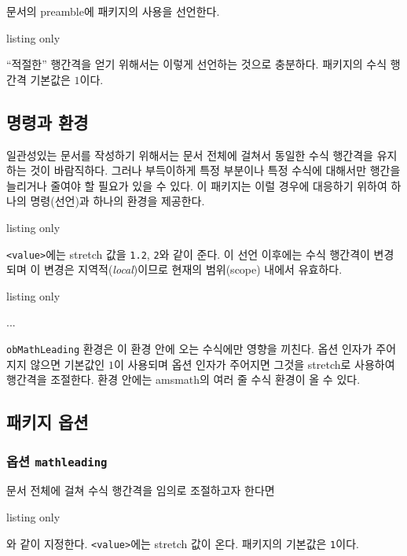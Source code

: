 \documentclass[a4paper,amsmath]{oblivoir}
\newcommand\pkg[1]{\textsf{#1}}
\begin{document}
문서의 preamble에 패키지의 사용을 선언한다.

\begin{tcblisting}{listing only}
    \usepackage{ob-mathleading}
\end{tcblisting}

``적절한'' 행간격을 얻기 위해서는 이렇게 선언하는 것으로 충분하다. 패키지의 수식 행간격 기본값은 $1$이다.

\subsection{명령과 환경}

일관성있는 문서를 작성하기 위해서는 문서 전체에 걸쳐서 동일한 수식 행간격을 유지하는 것이 바람직하다.
그러나 부득이하게 특정 부분이나 특정 수식에 대해서만 행간을 늘리거나 줄여야 할 필요가 있을 수 있다.
이 패키지는 이럴 경우에 대응하기 위하여 하나의 명령(선언)과 하나의 환경을 제공한다.

\begin{tcblisting}{listing only}
\end{tcblisting}

\verb|<value>|에는 stretch 값을 \verb|1.2|, \verb|2|와 같이 준다. 이 선언 이후에는 수식 행간격이 변경되며 이 변경은 지역적(\emph{local})이므로
현재의 범위(scope) 내에서 유효하다.

\begin{tcblisting}{listing only}
    \begin{obMathLeading}[<value>]
        ...
    \end{obMathLeading}
\end{tcblisting}

\verb|obMathLeading| 환경은 이 환경 안에 오는 수식에만 영향을 끼친다. 옵션 인자가 주어지지 않으면
기본값인 $1$이 사용되며 옵션 인자가 주어지면 그것을 stretch로 사용하여 행간격을 조절한다.
환경 안에는 \pkg{amsmath}의 여러 줄 수식 환경이 올 수 있다.

\subsection{패키지 옵션}

\subsubsection{옵션 \texttt{mathleading}}

문서 전체에 걸쳐 수식 행간격을 임의로 조절하고자 한다면
\begin{tcblisting}{listing only}
    \usepackage[mathleading=<value>]{ob-mathleading}
\end{tcblisting}
\noindent 와 같이 지정한다. \verb|<value>|에는 stretch 값이 온다. 패키지의 기본값은 \verb|1|이다.
\end{document}

